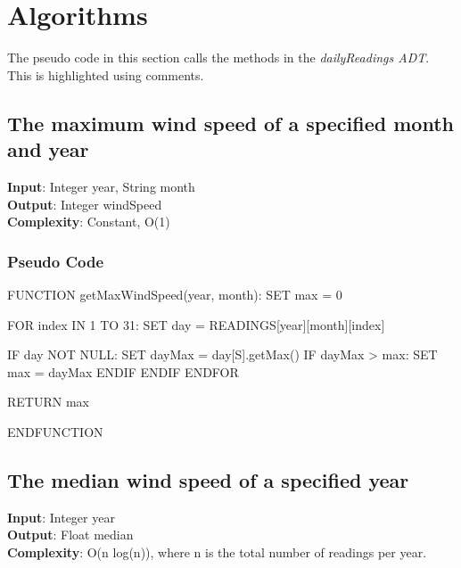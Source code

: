 \documentclass[12pt]{article}
\begin{document}
\section{Algorithms}
The pseudo code \cite{PSEUDOCODE} in this section calls the methods in the {\em dailyReadings ADT}. This is highlighted using comments. 
\subsection{The maximum wind speed of a specified month and year}
\textbf{Input}: Integer year, String month \\  
\textbf{Output}: Integer windSpeed \\
\textbf{Complexity}: Constant, O(1)
\subsubsection{Pseudo Code}
\begin{algorithm}[caption={Find maximum wind speed in a given month and year}, label=algo1]
FUNCTION getMaxWindSpeed(year, month):
SET max = 0

FOR index IN 1 TO 31:
SET day = READINGS[year][month][index]

IF day NOT NULL:
SET dayMax = day[S].getMax()
IF dayMax > max:
SET max = dayMax
ENDIF
ENDIF
ENDFOR

RETURN max

ENDFUNCTION
\end{algorithm}
\subsection{The median wind speed of a specified year}
\textbf{Input}: Integer year \\
\textbf{Output}: Float median \\
\textbf{Complexity}: O(n log(n)), where n is the total number of readings per year.
\end{document}
